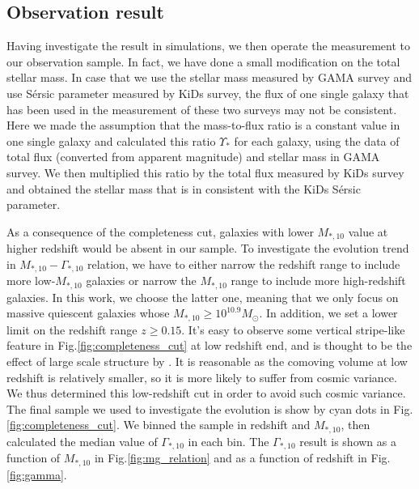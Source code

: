 \documentclass[fleqn,usenatbib]{mnras}
\begin{document}
\subsection{Observation result}
\label{sec:obres}
\par Having investigate the result in simulations, we then operate the measurement to our observation sample. In fact, we have done a small modification on the total stellar mass. In case that we use the stellar mass measured by GAMA survey and use S\'{e}rsic parameter measured by KiDs survey, the flux of one single galaxy that has been used in the measurement of these two surveys may not be consistent. Here we made the assumption that the mass-to-flux ratio is a constant value in one single galaxy and calculated this ratio $\Upsilon_*$ for each galaxy, using the data of total flux (converted from apparent magnitude) and stellar mass in GAMA survey. We then multiplied this ratio by the total flux measured by KiDs survey and obtained the stellar mass that is in consistent with the KiDs S\'{e}rsic parameter.  
\par As a consequence of the completeness cut, galaxies with lower $M_{*,10}$ value at higher redshift would be absent in our sample. To investigate the evolution trend in $M_{*,10 } - \Gamma_{*,10}$ relation, we have to either narrow the redshift range to include more low-$M_{*,10}$ galaxies or narrow the $M_{*,10}$ range to include more high-redshift galaxies. In this work, we choose the latter one, meaning that we only focus on massive quiescent galaxies whose $M_{*,10} \geq 10^{10.9} M_{\odot}$. In addition, we set a lower limit on the redshift range $ z \geq 0.15$. It's easy to observe some vertical stripe-like feature in Fig.\ref{fig:completeness_cut} at low redshift end, and is thought to be the effect of large scale structure by \cite{GAMAmain}. It is reasonable as the comoving volume at low redshift is relatively smaller, so it is more likely to suffer from cosmic variance. We thus determined this low-redshift cut in order to avoid such cosmic variance. The final sample we used to investigate the evolution is show by cyan dots in Fig.\ref{fig:completeness_cut}. We binned the sample in redshift and $M_{*,10}$, then calculated the median value of $\Gamma_{*,10}$ in each bin. The $\Gamma_{*,10}$ result is shown as a function of $M_{*,10}$ in Fig.\ref{fig:mg_relation} and as a function of redshift in Fig.\ref{fig:gamma}.
\end{document}
